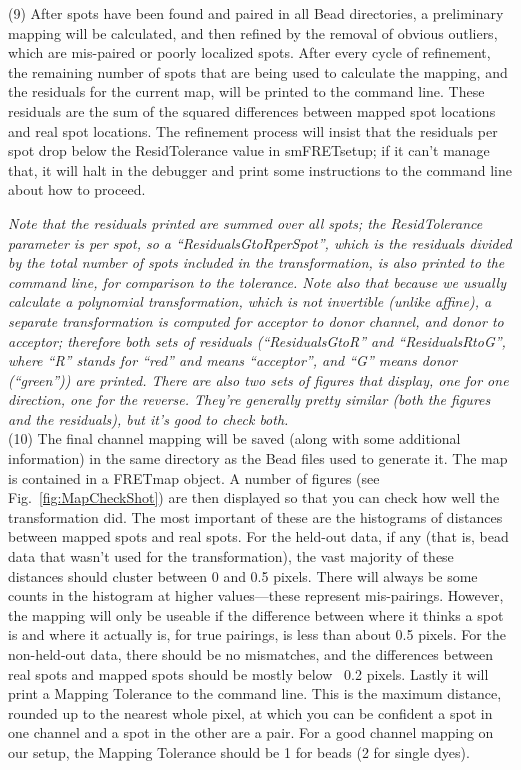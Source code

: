 \documentclass[11pt]{article}
\begin{document}
\noindent (9) After spots have been found and paired in all Bead directories, a preliminary mapping will be calculated, and then refined by the removal of obvious outliers, which are mis-paired or poorly localized spots.  After every cycle of refinement, the remaining number of spots that are being used to calculate the mapping, and the residuals for the current map, will be printed to the command line.  These residuals are the sum of the squared differences between mapped spot locations and real spot locations.  The refinement process will insist that the residuals per spot drop below the ResidTolerance value in smFRETsetup; if it can't manage that, it will halt in the debugger and print some instructions to the command line about how to proceed.

{\it Note that the residuals printed are summed over all spots; the ResidTolerance parameter is per spot, so a ``ResidualsGtoRperSpot'', which is the residuals divided by the total number of spots included in the transformation, is also printed to the command line, for comparison to the tolerance.  Note also that because we usually calculate a polynomial transformation, which is not invertible (unlike affine), a separate transformation is computed for acceptor to donor channel, and donor to acceptor; therefore both sets of residuals (``ResidualsGtoR'' and ``ResidualsRtoG'', where ``R'' stands for ``red'' and means ``acceptor'', and ``G'' means donor (``green'')) are printed.  There are also two sets of figures that display, one for one direction, one for the reverse.  They're generally pretty similar (both the figures and the residuals), but it's good to check both.}\\

\noindent (10) The final channel mapping will be saved (along with some additional information) in the same directory as the Bead files used to generate it. The map is contained in a FRETmap object.  A number of figures (see Fig.~\ref{fig:MapCheckShot}) are then displayed so that you can check how well the transformation did.  The most important of these are the histograms of distances between mapped spots and real spots. For the held-out data, if any (that is, bead data that wasn't used for the transformation), the vast majority of these distances should cluster between 0 and 0.5 pixels.  There will always be some counts in the histogram at higher values---these represent mis-pairings.  However, the mapping will only be useable if the difference between where it thinks a spot is and where it actually is, for true pairings, is less than about 0.5 pixels.  For the non-held-out data, there should be no mismatches, and the differences between real spots and mapped spots should be mostly below ~0.2 pixels.  Lastly it will print a Mapping Tolerance to the command line.  This is the maximum distance, rounded up to the nearest whole pixel, at which you can be confident a spot in one channel and a spot in the other are a pair.  For a good channel mapping on our setup, the Mapping Tolerance should be 1 for beads (2 for single dyes).
\end{document}
